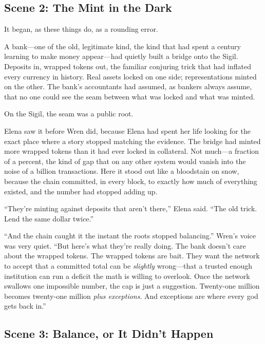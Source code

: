 \hypertarget{scene-2-the-mint-in-the-dark}{%
\subsection{Scene 2: The Mint in the
Dark}\label{scene-2-the-mint-in-the-dark}}

It began, as these things do, as a rounding error.

A bank---one of the old, legitimate kind, the kind that had spent a century
learning to make money appear---had quietly built a bridge onto the Sigil.
Deposits in, wrapped tokens out, the familiar conjuring trick that had inflated
every currency in history. Real assets locked on one side; representations
minted on the other. The bank's accountants had assumed, as bankers always
assume, that no one could see the seam between what was locked and what was
minted.

On the Sigil, the seam was a public root.

Elena saw it before Wren did, because Elena had spent her life looking for the
exact place where a story stopped matching the evidence. The bridge had minted
more wrapped tokens than it had ever locked in collateral. Not much---a
fraction of a percent, the kind of gap that on any other system would vanish
into the noise of a billion transactions. Here it stood out like a bloodstain
on snow, because the chain committed, in every block, to exactly how much of
everything existed, and the number had stopped adding up.

``They're minting against deposits that aren't there,'' Elena said. ``The old
trick. Lend the same dollar twice.''

``And the chain caught it the instant the roots stopped balancing.'' Wren's
voice was very quiet. ``But here's what they're really doing. The bank doesn't
care about the wrapped tokens. The wrapped tokens are bait. They want the network
to accept that a committed total can be \emph{slightly} wrong---that a trusted
enough institution can run a deficit the math is willing to overlook. Once the
network swallows one impossible number, the cap is just a suggestion. Twenty-one
million becomes twenty-one million \emph{plus exceptions}. And exceptions are
where every god gets back in.''

\hypertarget{scene-3-balance-or-it-didnt-happen}{%
\subsection{Scene 3: Balance, or It Didn't
Happen}\label{scene-3-balance-or-it-didnt-happen}}

